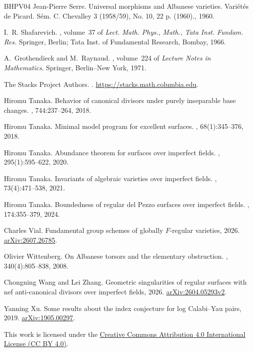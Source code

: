 \documentclass[10pt,abstract=true]{scrartcl}
\numberwithin{equation}{section}
\theoremstyle{definition}
\theoremstyle{remark}
\begin{document}
\begin{thebibliography}{BHPV04}
Jean-Pierre Serre.
\newblock Universal morphisms and {Albanese} varieties.
\newblock Vari{\'e}t{\'e}s de {Picard}. {S{\'e}m}. {C}. {Chevalley} 3 (1958/59), {No}. 10, 22 p. (1960)., 1960.

I.~R. Shafarevich.
, volume~37 of {\em Lect. Math. Phys., Math., Tata Inst. Fundam. Res.}
\newblock Springer, Berlin; Tata Inst. of Fundamental Research, Bombay, 1966.

A.~Grothendieck and M.~Raynaud.
, volume~224 of {\em Lecture Notes in Mathematics}.
\newblock Springer, Berlin--New York, 1971.

The Stacks Project Authors.
.
\newblock \url{https://stacks.math.columbia.edu}.

Hiromu Tanaka.
\newblock Behavior of canonical divisors under purely inseparable base changes.
, 744:237--264, 2018.

Hiromu Tanaka.
\newblock Minimal model program for excellent surfaces.
, 68(1):345--376, 2018.

Hiromu Tanaka.
\newblock Abundance theorem for surfaces over imperfect fields.
, 295(1):595--622, 2020.

Hiromu Tanaka.
\newblock Invariants of algebraic varieties over imperfect fields.
, 73(4):471--538, 2021.

Hiromu Tanaka.
\newblock Boundedness of regular del {Pezzo} surfaces over imperfect fields.
, 174:355--379, 2024.

Charles Vial.
\newblock Fundamental group schemes of globally {$F$}-regular varieties, 2026.
\newblock \href{https://arxiv.org/abs/2607.26785}{arXiv:2607.26785}.

Olivier Wittenberg.
\newblock On {A}lbanese torsors and the elementary obstruction.
, 340(4):805--838, 2008.

Chongning Wang and Lei Zhang.
\newblock Geometric singularities of regular surfaces with nef anti-canonical divisors over imperfect fields, 2026.
\newblock \href{https://arxiv.org/abs/2604.05293v2}{arXiv:2604.05293v2}.

Yanning Xu.
\newblock Some results about the index conjecture for log {Calabi--Yau} pairs, 2019.
\newblock \href{https://arxiv.org/abs/1905.00297}{arXiv:1905.00297}.

\end{thebibliography}

\par\bigskip
{\footnotesize\noindent
This work is licensed under the
\href{https://creativecommons.org/licenses/by/4.0/}{Creative Commons Attribution 4.0 International License (CC BY 4.0)}.\par}
\end{document}
